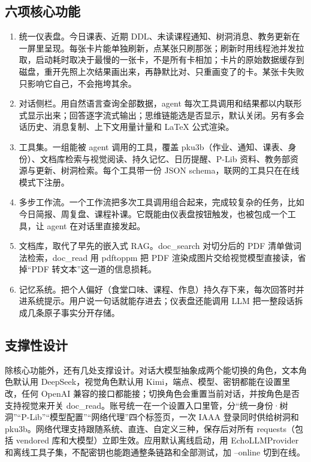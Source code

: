 \documentclass[UTF8,a4paper,11pt,fontset=none]{ctexart}
\newcommand{\code}[1]{{\ttfamily\small #1}}
\begin{document}
\subsection{六项核心功能}

\begin{enumerate}[label=\arabic*.]
\item 统一仪表盘。今日课表、近期 DDL、未读课程通知、树洞消息、教务更新在一屏里呈现。每张卡片能单独刷新，点某张只刷那张；刷新时用线程池并发拉取，启动耗时取决于最慢的一张卡，不是所有卡相加；卡片的原始数据缓存到磁盘，重开先照上次结果画出来，再静默比对、只重画变了的卡。某张卡失败只影响它自己，不会拖垮其余。
\item 对话侧栏。用自然语言查询全部数据，agent 每次工具调用和结果都以内联形式显示出来；回答逐字流式输出；思维链能选是否显示，默认关闭。另有多会话历史、消息复制、上下文用量计量和 LaTeX 公式渲染。
\item 工具集。一组能被 agent 调用的工具，覆盖 pku3b（作业、通知、课表、身份）、文档库检索与视觉阅读、持久记忆、日历提醒、P-Lib 资料、教务部资源与更新、树洞检索。每个工具带一份 JSON schema，联网的工具只在在线模式下注册。
\item 多步工作流。一个工作流把多次工具调用组合起来，完成较复杂的任务，比如今日简报、周复盘、课程补课。它既能由仪表盘按钮触发，也被包成一个工具，让 agent 在对话里直接发起。
\item 文档库，取代了早先的嵌入式 RAG。\code{doc\_search} 对切分后的 PDF 清单做词法检索，\code{doc\_read} 用 \code{pdftoppm} 把 PDF 渲染成图片交给视觉模型直接读，省掉“PDF 转文本”这一道的信息损耗。
\item 记忆系统。把个人偏好（食堂口味、课程、作息）持久存下来，每次回答时并进系统提示。用户说一句话就能存进去；仪表盘还能调用 LLM 把一整段话拆成几条原子事实分开存储。
\end{enumerate}

\subsection{支撑性设计}

除核心功能外，还有几处支撑设计。对话大模型抽象成两个能切换的角色，文本角色默认用 DeepSeek，视觉角色默认用 Kimi，端点、模型、密钥都能在设置里改，任何 OpenAI 兼容的接口都能接；切换角色会重置当前对话，并按角色是否支持视觉来开关 \code{doc\_read}。账号统一在一个设置入口里管，分“统一身份·树洞”“P-Lib”“模型配置”“网络代理”四个标签页，一次 IAAA 登录同时供给树洞和 pku3b。网络代理支持跟随系统、直连、自定义三种，保存后对所有 \code{requests}（包括 vendored 库和大模型）立即生效。应用默认离线启动，用 \code{EchoLLMProvider} 和离线工具子集，不配密钥也能跑通整条链路和全部测试，加 \code{--online} 切到在线。
\end{document}
